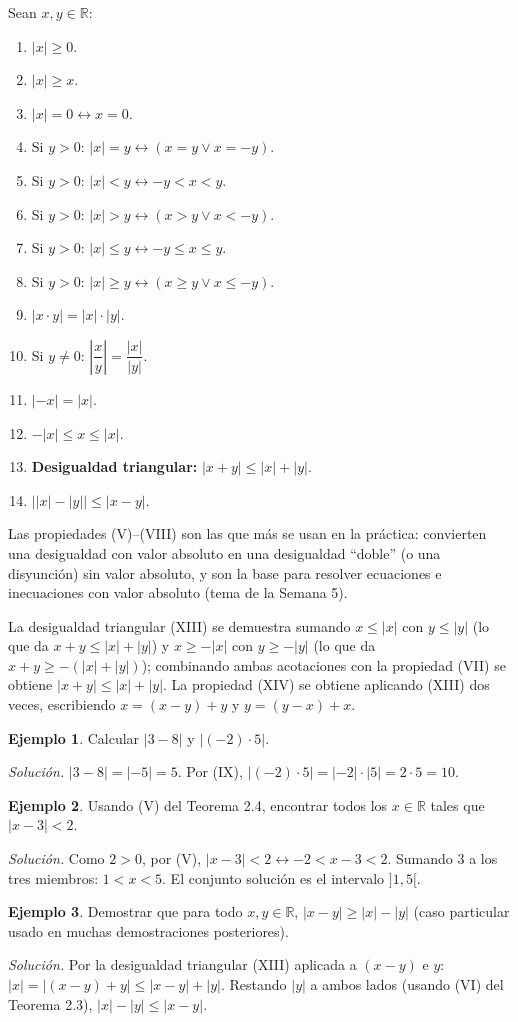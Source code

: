 \documentclass[11pt]{article}
\theoremstyle{plain}
\theoremstyle{definition}
\newtheorem{ejemplo}{Ejemplo}
\begin{document}
Sean $x,y \in \mathbb{R}$:
\begin{enumerate}[label=(\Roman*)]
  \item $|x|\ge 0$.
  \item $|x| \ge x$.
  \item $|x|=0 \leftrightarrow x=0$.
  \item Si $y>0$: $|x|=y \leftrightarrow (x=y \lor x=-y)$.
  \item Si $y>0$: $|x|<y \leftrightarrow -y<x<y$.
  \item Si $y>0$: $|x|>y \leftrightarrow (x>y \lor x<-y)$.
  \item Si $y>0$: $|x|\le y \leftrightarrow -y\le x\le y$.
  \item Si $y>0$: $|x|\ge y \leftrightarrow (x\ge y \lor x\le -y)$.
  \item $|x\cdot y| = |x|\cdot|y|$.
  \item Si $y\neq 0$: $\left|\dfrac{x}{y}\right| = \dfrac{|x|}{|y|}$.
  \item $|-x|=|x|$.
  \item $-|x|\le x\le |x|$.
  \item \textbf{Desigualdad triangular:} $|x+y|\le |x|+|y|$.
  \item $\big||x|-|y|\big| \le |x-y|$.
\end{enumerate}

Las propiedades (V)--(VIII) son las que más se usan en la práctica: convierten una desigualdad con
valor absoluto en una desigualdad ``doble'' (o una disyunción) sin valor absoluto, y son la base para
resolver ecuaciones e inecuaciones con valor absoluto (tema de la Semana 5).

La desigualdad triangular (XIII) se demuestra sumando $x\le|x|$ con $y\le|y|$ (lo que da
$x+y\le|x|+|y|$) y $x\ge -|x|$ con $y\ge -|y|$ (lo que da $x+y\ge -(|x|+|y|)$); combinando ambas
acotaciones con la propiedad (VII) se obtiene $|x+y|\le|x|+|y|$. La propiedad (XIV) se obtiene
aplicando (XIII) dos veces, escribiendo $x=(x-y)+y$ y $y=(y-x)+x$.

\begin{ejemplo}
Calcular $|3-8|$ y $|(-2)\cdot 5|$.

\emph{Solución.} $|3-8|=|-5|=5$. Por (IX), $|(-2)\cdot 5| = |-2|\cdot|5| = 2\cdot 5 = 10$.
\end{ejemplo}

\begin{ejemplo}
Usando (V) del Teorema 2.4, encontrar todos los $x\in\mathbb{R}$ tales que $|x-3|<2$.

\emph{Solución.} Como $2>0$, por (V), $|x-3|<2 \leftrightarrow -2<x-3<2$. Sumando $3$ a los tres
miembros: $1<x<5$. El conjunto solución es el intervalo $]1,5[$.
\end{ejemplo}

\begin{ejemplo}
Demostrar que para todo $x,y\in\mathbb{R}$, $|x-y| \ge |x|-|y|$ (caso particular usado en muchas
demostraciones posteriores).

\emph{Solución.} Por la desigualdad triangular (XIII) aplicada a $(x-y)$ e $y$: $|x| = |(x-y)+y| \le
|x-y|+|y|$. Restando $|y|$ a ambos lados (usando (VI) del Teorema 2.3), $|x|-|y| \le |x-y|$.
\end{ejemplo}
\end{document}
